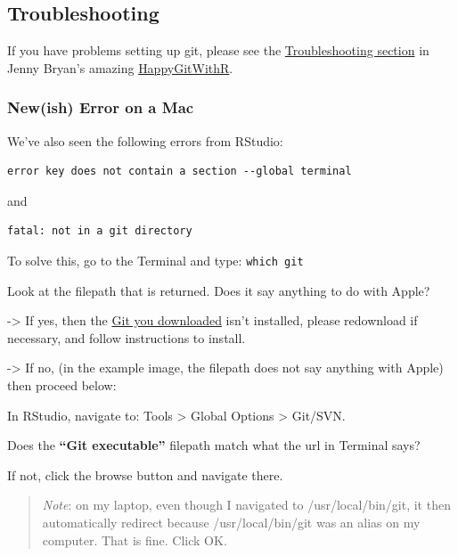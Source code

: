 \documentclass[]{book}
\begin{document}
\hypertarget{troubleshooting}{%
\subsection{Troubleshooting}\label{troubleshooting}}

If you have problems setting up git, please see the \href{http://happygitwithr.com/troubleshooting.html}{Troubleshooting section} in Jenny Bryan's amazing \href{http://happygitwithr.com}{HappyGitWithR}.

\hypertarget{newish-error-on-a-mac}{%
\subsubsection{New(ish) Error on a Mac}\label{newish-error-on-a-mac}}

We've also seen the following errors from RStudio:

\begin{verbatim}
error key does not contain a section --global terminal
\end{verbatim}

and

\begin{verbatim}
fatal: not in a git directory
\end{verbatim}

To solve this, go to the Terminal and type:
\texttt{which\ git}

Look at the filepath that is returned. Does it say anything to do with Apple?

-\textgreater{} If yes, then the \href{https://git-scm.com/downloads}{Git you downloaded} isn't installed, please redownload if necessary, and follow instructions to install.

-\textgreater{} If no, (in the example image, the filepath does not say anything with Apple) then proceed below:

In RStudio, navigate to: Tools \textgreater{} Global Options \textgreater{} Git/SVN.

Does the \textbf{``Git executable''} filepath match what the url in Terminal says?

If not, click the browse button and navigate there.

\begin{quote}
\emph{Note}: on my laptop, even though I navigated to /usr/local/bin/git, it then automatically redirect because /usr/local/bin/git was an alias on my computer. That is fine. Click OK.
\end{quote}
\end{document}
